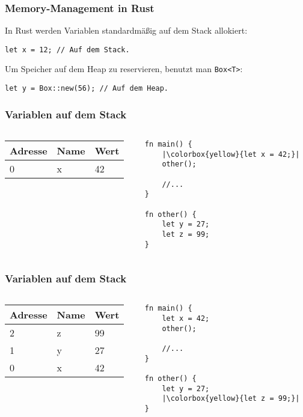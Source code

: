 \documentclass{beamer}
\begin{document}
\begin{frame}[fragile]
	\frametitle{Memory-Management in Rust}
	In Rust werden Variablen standardmäßig auf dem Stack allokiert:
	\begin{verbatim}
let x = 12; // Auf dem Stack.
	\end{verbatim}
	\vspace{1em}
	Um Speicher auf dem Heap zu reservieren, benutzt man \texttt{Box<T>}:
	\begin{verbatim}
let y = Box::new(56); // Auf dem Heap.
	\end{verbatim}
\end{frame}
\begin{frame}[fragile]
	\frametitle{Variablen auf dem Stack}
	\begin{columns}[T, c]
		\begin{column}{0.48\textwidth}
			\begin{tabular}{| l | l | l |}
				\hline
				Adresse & Name & Wert\\ \hline
				0 & x & 42 \\ \hline
			\end{tabular}
		\end{column}
		\begin{column}{0.48\textwidth}
			\begin{verbatim}
fn main() {
	|\colorbox{yellow}{let x = 42;}|
    other();

	//...
}

fn other() {
	let y = 27;
	let z = 99;
}
			\end{verbatim}
		\end{column}
	\end{columns}
\end{frame}
\begin{frame}[fragile]
	\frametitle{Variablen auf dem Stack}
	\begin{columns}[T, c]
		\begin{column}{0.48\textwidth}
			\begin{tabular}{| l | l | l |}
				\hline
				Adresse & Name & Wert \\ \hline
				2 & z & 99 \\ \hline
				1 & y & 27 \\ \hline
				0 & x & 42 \\ \hline
			\end{tabular}
		\end{column}
		\begin{column}{0.48\textwidth}
			\begin{verbatim}
fn main() {
	let x = 42;
	other();

	//...
}

fn other() {
	let y = 27;
	|\colorbox{yellow}{let z = 99;}|
}
			\end{verbatim}
		\end{column}
	\end{columns}
\end{frame}
\end{document}
